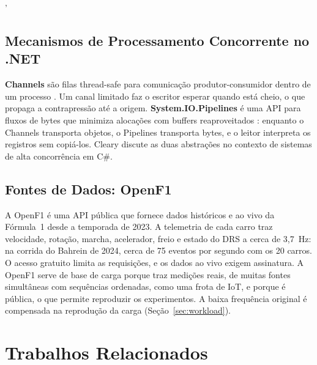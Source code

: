 '\documentclass[12pt]{article}
\begin{document}
\subsection{Mecanismos de Processamento Concorrente no .NET}

\textbf{Channels} são filas thread-safe para comunicação produtor-consumidor dentro de um
processo \cite{microsoft:channels}. Um canal limitado faz o escritor esperar quando está
cheio, o que propaga a contrapressão até a origem. \textbf{System.IO.Pipelines} é uma API
para fluxos de bytes que minimiza alocações com buffers reaproveitados
\cite{microsoft:pipelines}: enquanto o Channels transporta objetos, o Pipelines transporta
bytes, e o leitor interpreta os registros sem copiá-los. Cleary \cite{cleary:2019}
discute as duas abstrações no contexto de sistemas de alta concorrência em C\#.

\subsection{Fontes de Dados: OpenF1}

A OpenF1 \cite{openf1:2024} é uma API pública que fornece dados históricos e ao vivo da
Fórmula~1 desde a temporada de 2023. A telemetria de cada carro traz velocidade, rotação,
marcha, acelerador, freio e estado do DRS a cerca de 3,7~Hz: na corrida do Bahrein de
2024, cerca de 75 eventos por segundo com os 20 carros. O acesso gratuito limita as
requisições, e os dados ao vivo exigem assinatura. A OpenF1 serve de base de carga porque
traz medições reais, de muitas fontes simultâneas com sequências ordenadas, como uma frota
de IoT, e porque é pública, o que permite reproduzir os experimentos. A baixa frequência
original é compensada na reprodução da carga (Seção~\ref{sec:workload}).


\section{Trabalhos Relacionados}
\label{sec:relacionados}
\end{document}

